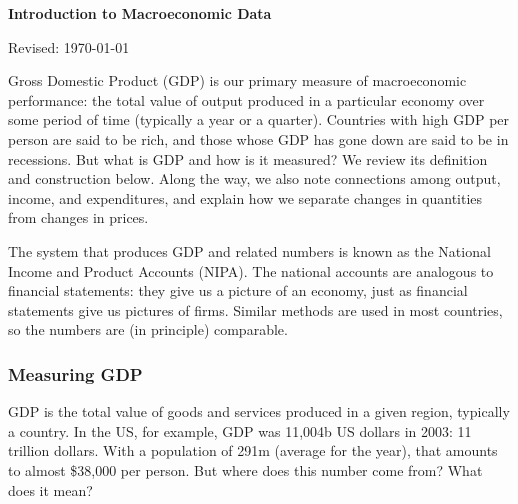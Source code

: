 \documentclass[12pt,letterpaper]{article}
\def\HeadName{Macroeconomic Data}
\begin{document}
\thispagestyle{empty}%
\Head

\centerline{\large \bf Introduction to \HeadName}%
\centerline{Revised: \today}

\bigskip
Gross Domestic Product (GDP) is our primary measure of
macroeconomic performance:  the total value of output produced in
a particular economy over some period of time (typically a year or
a quarter). Countries with high GDP per person are said to be
rich, and those whose GDP has gone down are said to be in
recessions. But what is GDP and how is it measured?
We review its definition and construction below.
Along the way, we also
note connections among output, income, and expenditures,
and explain how we separate changes in quantities
from changes in prices.

The system that produces GDP and related numbers
is known as the National Income and Product Accounts
(NIPA).
The national accounts are analogous to financial statements:
they give us a picture of an economy,
just as financial statements give us pictures of firms.
Similar methods are used in most countries, so the numbers
are (in principle) comparable.


\subsubsection*{Measuring GDP}

GDP is the total value of goods and services produced in a given region,
typically a country.
In the US, for example, GDP was 11,004b US dollars in 2003:
11 trillion dollars.
With a population of 291m (average for the year),
that amounts to almost \$38,000 per person.
But where does this number come from?  What does it mean?
\end{document}
